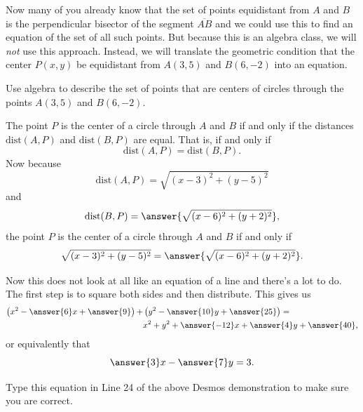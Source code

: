 \documentclass{ximera}
\begin{document}
\begin{example}
\begin{explanation}
Now many of you already know that the set of points equidistant from $A$ and $B$ is the perpendicular bisector of the segment $\overline{AB}$ and we could use this to find an equation of the set of all such points. But because this is an algebra class, we will \emph{not} use this approach. Instead, we will translate the geometric condition that the center $P(x,y)$ be equidistant from $A(3,5)$ and $B(6,-2)$ into an equation.

\end{explanation}
\end{example}

\begin{question}   \label{Q0dfdf9e9ee}
Use algebra to describe the set of points that are centers of circles through the points $A(3,5)$ and $B(6,-2)$.

\begin{explanation}
The point $P$ is the center of a circle through $A$ and $B$ if and only if the distances $\text{dist}(A,P)$ and $\text{dist}(B,P)$ are equal. That is, if and only if
\[
   \text{dist}(A,P)  = \text{dist}(B,P) .
\]
Now because
\[
   \text{dist}(A,P) = \sqrt{(x-3)^2 + (y-5)^2}
\] 
and
\[
  \text{dist}(B,P) = \answer{\sqrt{(x-6)^2 + (y+2)^2}} ,
\]
the point $P$ is the center of a circle through $A$ and $B$ if and only if
\[
   \sqrt{(x-3)^2 + (y-5)^2} = \answer{\sqrt{(x-6)^2 + (y+2)^2}} .
\]

Now this does not look at all like an equation of a line and there's a lot to do. The first step is to square both sides and then distribute. This gives us
\begin{align*}
      \left( x^2 - \answer{6}x +\answer{9}  \right) + & \left( y^2 - \answer{10}y +\answer{25} \right)  = \\
                                                                          & x^2 + y^2 +\answer{-12}x + \answer{4}y + \answer{40} ,
\end{align*} 
or equivalently that
\[
    \answer{3}x - \answer{7}y = 3 .
\]
 
Type this equation in Line 24 of the above Desmos demonstration to make sure you are correct.

\end{explanation}
\end{question}
\end{document}
